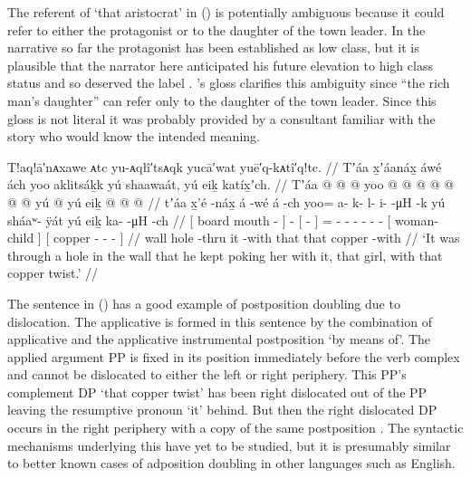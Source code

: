 The referent of  ‘that aristocrat’ in (\lastx) is potentially ambiguous because it could refer to either the protagonist or to the daughter of the town leader.
In the narrative so far the protagonist has been established as low class, but it is plausible that the narrator here anticipated his future elevation to high class status and so deserved the label .
\citeauthor{swanton:1909}’s gloss clarifies this ambiguity since “the rich man’s daughter” can refer only to the daughter of the town leader.
Since this gloss is not literal it was probably provided by a consultant familiar with the story who would know the intended meaning.

\ex\label{ex:89-155-poked-her-thru-wall}%
%
\begingl
	\glpreamble	T!aq!ā′nᴀxawe ᴀtc yu-ᴀqłî′tsᴀqk yucā′wat yuē′q-kᴀtî′q!tc. //
	\glpreamble	Tʼáa x̱ʼáanáx̱ áwé ách yoo aklitsáḵk yú shaawaát, yú eiḵ katíx̱ʼch. //
	\gla	{} Tʼáa  @ {} {}  @ {}
		{}  @ {} {}
		yoo @  @ {} @ {} @ {} @ {} @ {} @ {}
		{} yú  @ {} {}
		{} yú eiḵ  @ {} @ {} @ {} {} //
	\glb	{} tʼáa x̱'é -náx̱ {} á -wé
		{} á -ch {}
		yoo= a- k- l- i-  -μH -k
		{} yú sháaʷ- ÿát {}
		{} yú eiḵ ka-  -μH -ch {} //
	\glc	{}[ board mouth - {}]  -
		{}[  - {}]
		= - - - -  - -
		{}[  woman- child {}]
		{}[  copper -  - - {}] //
	\gld	{} wall hole -thru {}  {}
		{} it -with {}
		  {} {} {} {} {} {}
		{} that  {} {}
		{} that copper  {} {} -with {} //
	\glft	‘It was through a hole in the wall that he kept poking her with it, that girl, with that copper twist.’
		//
\endgl
\xe

The sentence in (\lastx) has a good example of postposition doubling due to dislocation.
The applicative is formed in this sentence by the combination of applicative  and the applicative instrumental postposition  ‘by means of’.
The applied argument PP is fixed in its position immediately before the verb complex and cannot be dislocated to either the left or right periphery.
This PP’s complement DP  ‘that copper twist’ has been right dislocated out of the PP leaving the resumptive pronoun  ‘it’ behind.
But then the right dislocated DP occurs in the right periphery with a copy of the same postposition .
The syntactic mechanisms underlying this have yet to be studied, but it is presumably similar to better known cases of adposition doubling in other languages such as English.

